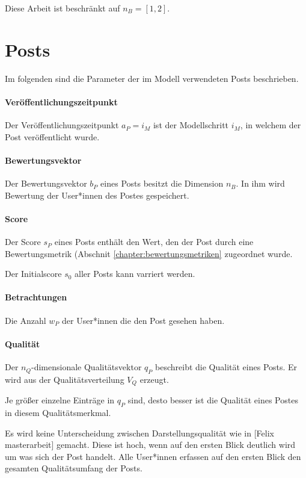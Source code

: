 Diese Arbeit ist beschränkt auf $n_B = [1,2]$. 

\section{Posts}

Im folgenden sind die Parameter der im Modell verwendeten Posts beschrieben.

\paragraph{Veröffentlichungszeitpunkt}
Der Veröffentlichungszeitpunkt $a_P = i_M$ ist der Modellschritt $i_M$, in welchem der Post veröffentlicht wurde.

\paragraph{Bewertungsvektor}

Der Bewertungsvektor $b_P$ eines Posts besitzt die Dimension $n_B$. In ihm wird Bewertung der User*innen des Postes gespeichert.

\paragraph{Score}

Der Score $s_P$ eines Posts enthält den Wert, den der Post durch eine Bewertungsmetrik (Abschnit \ref{chapter:bewertungsmetriken} zugeordnet wurde.

Der Initialscore $s_{0}$ aller Posts kann varriert werden.

\paragraph{Betrachtungen}

Die Anzahl $w_P$ der User*innen  die den Post gesehen haben.


\paragraph{Qualität}
\label{pqualitaet}

Der $n_Q$-dimensionale Qualitätsvektor $q_P$ beschreibt die Qualität eines Posts. Er wird aus der Qualitätsverteilung $V_Q$ erzeugt. 

Je größer einzelne Einträge in $q_P$ sind, desto besser ist die Qualität eines Postes in diesem Qualitätsmerkmal.

Es wird keine Unterscheidung zwischen Darstellungsqualität wie in [Felix masterarbeit] gemacht. Diese ist hoch, wenn auf den ersten Blick deutlich wird um was sich der Post handelt. Alle User*innen erfassen auf den ersten Blick den gesamten Qualitätsumfang der Posts.

